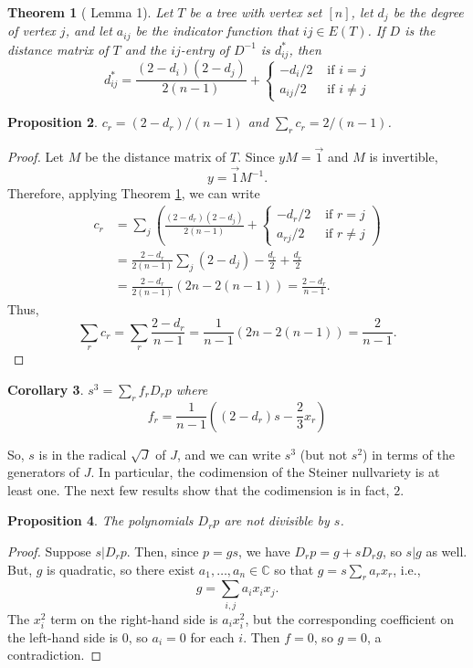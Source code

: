 \documentclass{article}
\newtheorem{theorem}{Theorem}[section]
\newtheorem{prop}[theorem]{Proposition}
\newtheorem{cor}[theorem]{Corollary}
\begin{document}
\begin{theorem}[\cite{GraLov78} Lemma 1] \label{thm:GLinversedistance} Let $T$ be a tree with vertex set $[n]$, let $d_j$ be the degree of vertex $j$, and let $a_{ij}$ be the indicator function that $ij \in E(T)$.  If $D$ is the distance matrix of $T$ and the $ij$-entry of $D^{-1}$ is $d^\ast_{ij}$, then
$$
d^\ast_{ij} = \frac{(2-d_i)(2-d_j)}{2(n-1)} + \left \{ \begin{array}{ll}
-d_i/2 & \text{ if } i=j \\
a_{ij}/2 & \text{ if } i \neq j 
\end{array}
\right .
$$
\end{theorem}

\begin{prop} $c_r = (2-d_r)/(n-1)$ and $\sum_r c_r = 2/(n-1)$.
\end{prop}
\begin{proof}
    Let $M$ be the distance matrix of $T$.  Since $yM = \vec{1}$ and $M$ is invertible,
    $$
    y = \vec{1} M^{-1}.
    $$
    Therefore, applying Theorem \ref{thm:GLinversedistance}, we can write
    \begin{align*}
    c_r &= \sum_j \left ( \frac{(2-d_r)(2-d_j)}{2(n-1)} + \left \{ \begin{array}{ll}
-d_r/2 & \text{ if } r=j \\
a_{rj}/2 & \text{ if } r \neq j 
\end{array}  \right . \right ) \\
&= \frac{2-d_r}{2(n-1)} \sum_j (2-d_j) - \frac{d_r}{2} + \frac{d_r}{2} \\
&= \frac{2-d_r}{2(n-1)} (2n - 2(n-1)) = \frac{2-d_r}{n-1}.
    \end{align*}
Thus,
$$
\sum_r c_r = \sum_r \frac{2-d_r}{n-1} = \frac{1}{n-1} (2n - 2(n-1)) = \frac{2}{n-1}.
$$
\end{proof}

 \begin{cor} $s^3 = \sum_r f_r D_r p$ where
$$
f_r = \frac{1}{n-1} \left ( (2-d_r) s - \frac{2}{3}x_r \right )
$$
\end{cor}

So, $s$ is in the radical $\sqrt{J}$ of $J$, and we can write $s^3$ (but not $s^2$) in terms of the generators of $J$.  In particular, the codimension of the Steiner nullvariety is at least one. The next few results show that the codimension is in fact, $2$.

\begin{prop} \label{prop:notdivisible}
    The polynomials $D_r p$ are not divisible by $s$.
\end{prop}
\begin{proof}
    Suppose $s | D_r p$.  Then, since $p = gs$, we have $D_r p = g + s D_r g$, so $s | g$ as well.  But, $g$ is quadratic, so there exist $a_1,\ldots,a_n \in \mathbb{C}$ so that $g = s \sum_{r} a_r x_r$, i.e.,
    $$
    g = \sum_{i,j} a_i x_i x_j.
    $$
    The $x_i^2$ term on the right-hand side is $a_i x_i^2$, but the corresponding coefficient on the left-hand side is $0$, so $a_i = 0$ for each $i$.  Then $f=0$, so $g=0$, a contradiction.
\end{proof}
\end{document}

